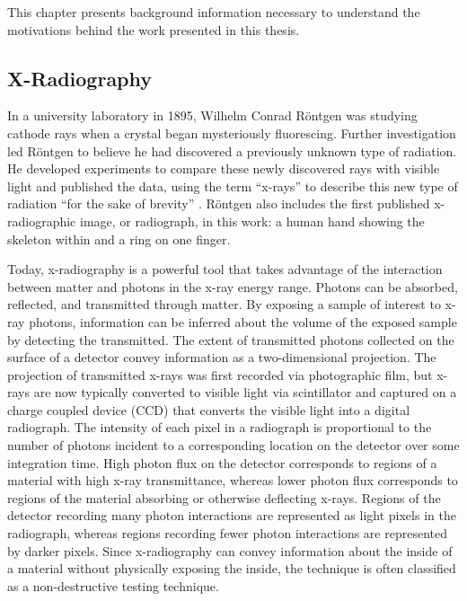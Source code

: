 This chapter presents background information necessary to understand the
motivations behind the work presented in this thesis.

\subsection{X-Radiography}
In a university laboratory in 1895, Wilhelm Conrad Röntgen was studying
cathode rays when a crystal began mysteriously fluorescing. Further
investigation led Röntgen to believe he had discovered a previously
unknown type of radiation. He developed experiments to compare these newly
discovered rays with visible light and published the data, using the term
``x-rays'' to describe this new type of radiation ``for the sake of brevity''
\cite{Rontgen1896}. Röntgen also includes the first published x-radiographic
image, or radiograph, in this work: a human hand showing the skeleton
within and a ring on one finger.

Today, x-radiography is a powerful tool that takes advantage of the
interaction between matter and photons in the x-ray energy range. Photons
can be absorbed, reflected, and transmitted through matter. By exposing a
sample of interest to x-ray photons, information can be inferred about the
volume of the exposed sample by detecting the transmitted. The extent of
transmitted photons collected on the surface of a detector convey
information as a two-dimensional projection. The projection of transmitted
x-rays was first recorded via photographic film, but x-rays are now
typically converted to visible light via scintillator and  captured on a
charge coupled device (CCD) that converts the visible light into a digital
radiograph. The intensity of each pixel in a radiograph is proportional to
the number of photons incident to a corresponding location on the detector
over some integration time. High photon flux on the detector corresponds
to regions of a material with high x-ray transmittance, whereas lower
photon flux corresponds to regions of the material absorbing or otherwise
deflecting x-rays. Regions of the detector recording many photon
interactions are represented as light pixels in the radiograph, whereas
regions recording fewer photon interactions are represented by darker
pixels. Since x-radiography can convey information about the inside of a
material without physically exposing the inside, the technique is often
classified as a non-destructive testing technique.


